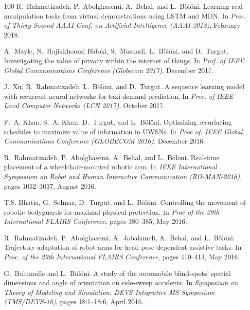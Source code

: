 \begin{thebibliography}{100}
R.~Rahmatizadeh, P.~Abolghasemi, A.~Behal, and L.~Bölöni.
\newblock Learning real manipulation tasks from virtual demonstrations using
  {LSTM} and {MDN}.
\newblock In {\em Proc. of Thirty-Second AAAI Conf. on Artificial Intelligence
  (AAAI-2018)}, February 2018.

A.~Mayle, N.~Hajiakhoond Bidoki, S.~Masnadi, L.~Bölöni, and D.~Turgut.
\newblock Investigating the value of privacy within the internet of things.
\newblock In {\em Prof. of IEEE Global Communications Conference (Globecom
  2017)}, December 2017.

J.~Xu, R.~Rahmatizadeh, L.~Bölöni, and D.~Turgut.
\newblock A sequence learning model with recurrent neural networks for taxi
  demand prediction.
\newblock In {\em Proc. of IEEE Local Computer Networks (LCN 2017)}, October
  2017.

F.~A. Khan, S.~A. Khan, D.~Turgut, and L.~Bölöni.
\newblock Optimizing resurfacing schedules to maximize value of information in
  {UWSN}s.
\newblock In {\em Proc of. IEEE Global Communications Conference (GLOBECOM
  2016)}, December 2016.

R.~Rahmatizadeh, P.~Abolghasemi, A.~Behal, and L.~Bölöni.
\newblock Real-time placement of a wheelchair-mounted robotic arm.
\newblock In {\em IEEE International Symposium on Robot and Human Interactive
  Communication (RO-MAN-2016)}, pages 1032--1037, August 2016.

T.S. Bhatia, G.~Solmaz, D.~Turgut, and L.~Bölöni.
\newblock Controlling the movement of robotic bodyguards for maximal physical
  protection.
\newblock In {\em Proc of the 29th International FLAIRS Conference}, pages
  380--385, May 2016.

R.~Rahmatizadeh, P.~Abolghasemi, A.~Jabalameli, A.~Behal, and L.~Bölöni.
\newblock Trajectory adaptation of robot arms for head-pose dependent assistive
  tasks.
\newblock In {\em Proc. of the 29th International FLAIRS Conference}, pages
  410--413, May 2016.

G.~Bulumulle and L.~Bölöni.
\newblock A study of the automobile blind-spots' spatial dimensions and angle
  of orientation on side-sweep accidents.
\newblock In {\em Symposium on Theory of Modeling and Simulation: DEVS
  Integrative MS Symposium (TMS/DEVS-16)}, pages 18:1--18:6, April 2016.


\end{thebibliography}
